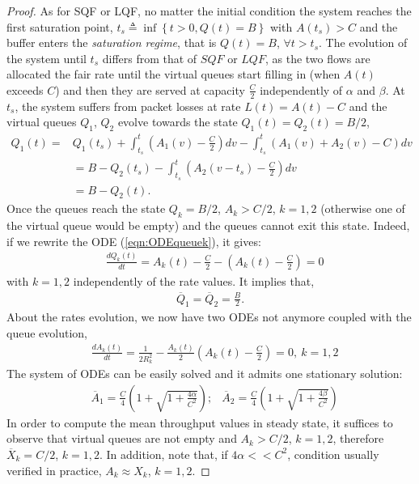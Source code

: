 \documentclass[a4paper,oneside, 11pt]{article}
\begin{document}
\begin{proof}
As for SQF or LQF, no matter the initial condition the system reaches the first saturation point,
$t_s \triangleq  \inf\left \{ t>0, Q(t)=B \right \}$
with $A(t_s)>C$
and the buffer enters  the \textit{saturation regime}, that is $Q(t)=B$, $\forall t>t_s$.
The evolution of the system until $t_s$ differs from that of $SQF$ or $LQF$,
as the two flows are allocated the fair rate until the virtual queues start filling in (when $A(t)$ exceeds $C$) and then they are served at capacity $\frac{C}{2}$ independently of $\alpha$ and $\beta$.
At $t_s$, the system suffers from packet losses at rate $L(t)=A(t)-C$ and the virtual queues $Q_1$, $Q_2$ evolve towards the state
$Q_1(t)=Q_2(t)=B/2$, \begin{align*}
 Q_1(t)=& Q_1(t_s)+\int_{t_s}^{t} (A_1(v)-\frac{C}{2})dv-\int_{t_s}^{t} (A_1(v)+A_2(v)-C)dv \nonumber\\
        &=B-Q_2(t_s)-\int_{t_s}^{t} (A_2(v-t_s)-\frac{C}{2})dv \nonumber \\
        &=B- Q_2(t).
\end{align*}
Once the queues reach the state $Q_k=B/2$, $A_k>C/2$, $k=1,2$ (otherwise one of the virtual queue would be empty) and the queues cannot exit this state.
Indeed, if we rewrite the ODE (\ref{eqn:ODEqueuek}), it gives:\begin{align}\label{eq:fixedpoint_Q_FQ}
&\frac{dQ_k(t)}{dt}=A_k(t)-\frac{C}{2}-\left(A_k(t)-\frac{C}{2}\right)=0
\end{align}
with $k=1,2$ independently of the rate values.
It implies that,
\begin{align}\label{mean_queues_FQ}
\overline{Q}_1=\overline{Q}_2=\frac{B}{2}.
\end{align}
About the rates evolution, we now have two ODEs not anymore coupled with the queue evolution,
\begin{align}\label{eq:fixedpoint_A_FQ}
&\frac{dA_k(t)}{dt}=\frac{1}{2 R_k^2}-\frac{A_k(t)}{2}\left(A_k(t)-\frac{C}{2}\right)=0, ~ k=1,2
\end{align}
The system of ODEs can be easily solved and it admits one stationary solution:
\begin{align}\label{mean_rates_FQ}
&\overline{A}_1=\frac{C}{4}\left(1+\sqrt{1+\frac{4\alpha}{C^2}}\right); &\overline{A}_2=\frac{C}{4}\left(1+\sqrt{1+\frac{4\beta}{C^2}}\right)
\end{align}
In order to compute the mean throughput values in steady state, it suffices to observe that virtual queues are not empty and $A_k>C/2$, $k=1,2$,
therefore $\overline{X}_k=C/2$,
 $k=1,2$. In addition,
note that, if $4\alpha<<C^2$, condition usually verified in practice, $A_k\approx X_k$, $k=1,2$.
\end{proof}
\end{document}
